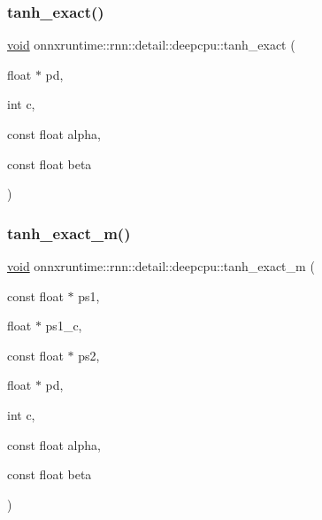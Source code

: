 \subsubsection{\texorpdfstring{tanh\+\_\+exact()}{tanh\_exact()}}
{\footnotesize\ttfamily \mbox{\hyperlink{mlasi_8h_a88f941d423cb2a819b70a1358982b1a6}{void}} onnxruntime\+::rnn\+::detail\+::deepcpu\+::tanh\+\_\+exact (\begin{DoxyParamCaption}\item[{float $\ast$}]{pd,  }\item[{int}]{c,  }\item[{const float}]{alpha,  }\item[{const float}]{beta }\end{DoxyParamCaption})}

\mbox{\label{namespaceonnxruntime_1_1rnn_1_1detail_1_1deepcpu_a58cffec73fb2b97544714c6d4a5b3767}} 
\subsubsection{\texorpdfstring{tanh\+\_\+exact\+\_\+m()}{tanh\_exact\_m()}}
{\footnotesize\ttfamily \mbox{\hyperlink{mlasi_8h_a88f941d423cb2a819b70a1358982b1a6}{void}} onnxruntime\+::rnn\+::detail\+::deepcpu\+::tanh\+\_\+exact\+\_\+m (\begin{DoxyParamCaption}\item[{const float $\ast$}]{ps1,  }\item[{float $\ast$}]{ps1\+\_\+c,  }\item[{const float $\ast$}]{ps2,  }\item[{float $\ast$}]{pd,  }\item[{int}]{c,  }\item[{const float}]{alpha,  }\item[{const float}]{beta }\end{DoxyParamCaption})}

\mbox{\label{namespaceonnxruntime_1_1rnn_1_1detail_1_1deepcpu_aae689eb766818fc1c1da8aa2bc923b31}} 

